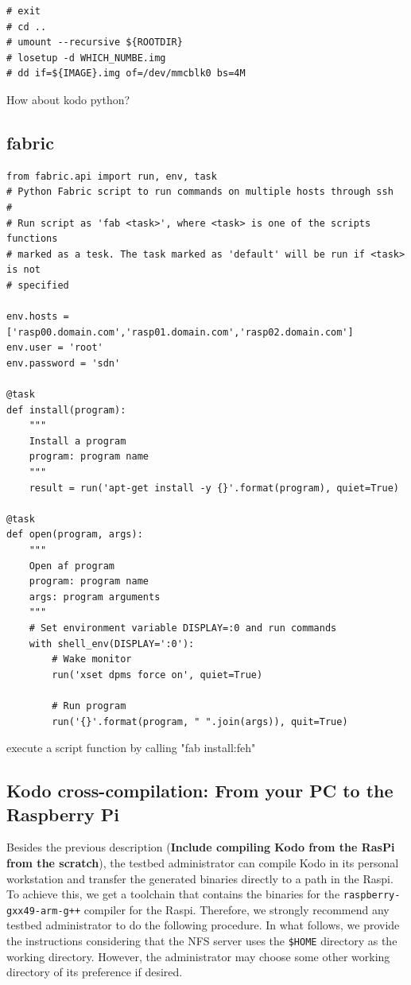 \begin{lstlisting}[]
# exit
# cd ..
# umount --recursive ${ROOTDIR}
# losetup -d WHICH_NUMBE.img
# dd if=${IMAGE}.img of=/dev/mmcblk0 bs=4M
\end{lstlisting}
\FloatBarrier

How about kodo python?

\subsection{fabric}

\begin{lstlisting}[]
from fabric.api import run, env, task
# Python Fabric script to run commands on multiple hosts through ssh
#
# Run script as 'fab <task>', where <task> is one of the scripts functions
# marked as a tesk. The task marked as 'default' will be run if <task> is not
# specified

env.hosts = ['rasp00.domain.com','rasp01.domain.com','rasp02.domain.com']
env.user = 'root'
env.password = 'sdn'

@task
def install(program):
    """
    Install a program
    program: program name
    """
    result = run('apt-get install -y {}'.format(program), quiet=True)

@task
def open(program, args):
    """
    Open af program
    program: program name
    args: program arguments
    """
    # Set environment variable DISPLAY=:0 and run commands
    with shell_env(DISPLAY=':0'):
        # Wake monitor
        run('xset dpms force on', quiet=True)

        # Run program
        run('{}'.format(program, " ".join(args)), quit=True)

\end{lstlisting}
\FloatBarrier

execute a script function by calling "fab install:feh"

\subsection{Kodo cross-compilation: From your PC to the Raspberry Pi}

Besides the previous description (\textbf{Include compiling Kodo from the
RasPi from the scratch}), the testbed administrator can compile Kodo in its
personal workstation and transfer the generated binaries directly to
a path in the \ac{Raspi}. To achieve this, we get a toolchain that
contains the binaries for the \texttt{raspberry-gxx49-arm-g++} compiler
for the \ac{Raspi}. Therefore, we strongly recommend any testbed
administrator to do the following procedure. In what follows, we provide
the instructions considering that the NFS server uses the \texttt{\$HOME}
directory as the working directory. However, the administrator may choose
some other working directory of its preference if desired.

